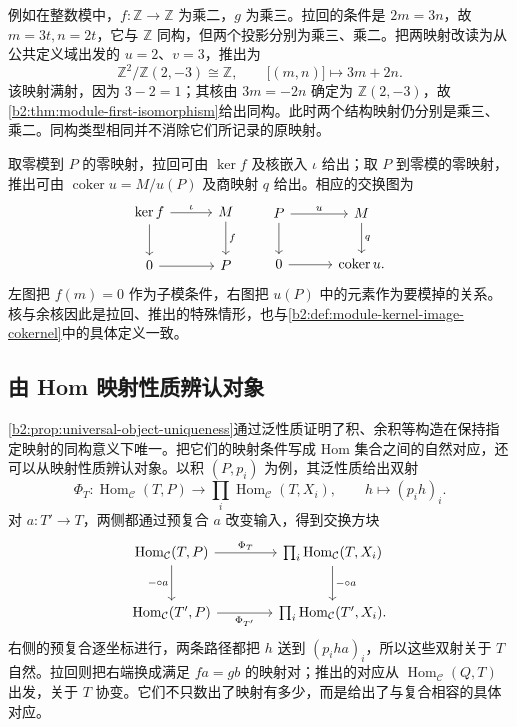\ProseParagraphBreak
例如在整数模中，\(f:\mathbb Z\rightarrow\mathbb Z\) 为乘二，\(g\) 为乘三。拉回的条件是 \(2m=3n\)，故 \(m=3t,n=2t\)，它与 \(\mathbb Z\) 同构，但两个投影分别为乘三、乘二。把两映射改读为从公共定义域出发的 \(u=2\)、\(v=3\)，推出为
\[
	\mathbb Z^2/\mathbb Z(2,-3)\cong\mathbb Z, \qquad \bigl[(m,n)\bigr]\longmapsto3m+2n.
\]
该映射满射，因为 \(3-2=1\)；其核由 \(3m=-2n\) 确定为 \(\mathbb Z(2,-3)\)，故\cref{b2:thm:module-first-isomorphism}给出同构。此时两个结构映射仍分别是乘三、乘二。同构类型相同并不消除它们所记录的原映射。

\ProseParagraphBreak
取零模到 \(P\) 的零映射，拉回可由 \(\ker f\) 及核嵌入 \(\iota\) 给出；取 \(P\) 到零模的零映射，推出可由 \(\operatorname{coker}u=M/u(P)\) 及商映射 \(q\) 给出。相应的交换图为
\[
	\begin{tikzcd}[column sep=3em,row sep=2.2em]
		\ker f\arrow[r,"\iota"]\arrow[d]&M\arrow[d,"f"]\\
		0\arrow[r]&P
	\end{tikzcd}
	\qquad
	\begin{tikzcd}[column sep=3em,row sep=2.2em]
		P\arrow[r,"u"]\arrow[d]&M\arrow[d,"q"]\\
		0\arrow[r]&\operatorname{coker}u.
	\end{tikzcd}
\]
左图把 \(f(m)=0\) 作为子模条件，右图把 \(u(P)\) 中的元素作为要模掉的关系。核与余核因此是拉回、推出的特殊情形，也与\cref{b2:def:module-kernel-image-cokernel}中的具体定义一致。

\subsection{由 Hom 映射性质辨认对象}
\label{b2:subsec:0503:03}

\cref{b2:prop:universal-object-uniqueness}通过泛性质证明了积、余积等构造在保持指定映射的同构意义下唯一。把它们的映射条件写成 Hom 集合之间的自然对应，还可以从映射性质辨认对象。以积 \((P,p_i)\) 为例，其泛性质给出双射
\[
	\Phi_T:\operatorname{Hom}_{\mathcal C}(T,P)\longrightarrow \prod_i\operatorname{Hom}_{\mathcal C}(T,X_i),\qquad h\longmapsto(p_ih)_i.
\]
对 \(a:T'\rightarrow T\)，两侧都通过预复合 \(a\) 改变输入，得到交换方块
\[
	\begin{tikzcd}[column sep=4em,row sep=2.5em]
		\operatorname{Hom}_{\mathcal C}(T,P) \arrow[r,"\Phi_T"]\arrow[d,"-\circ a"']& \prod_i\operatorname{Hom}_{\mathcal C}(T,X_i)\arrow[d,"-\circ a"]\\
		\operatorname{Hom}_{\mathcal C}(T',P)\arrow[r,"\Phi_{T'}"']& \prod_i\operatorname{Hom}_{\mathcal C}(T',X_i).
	\end{tikzcd}
\]
右侧的预复合逐坐标进行，两条路径都把 \(h\) 送到 \((p_iha)_i\)，所以这些双射关于 \(T\) 自然。拉回则把右端换成满足 \(fa=gb\) 的映射对；推出的对应从 \(\operatorname{Hom}_{\mathcal C}(Q,T)\) 出发，关于 \(T\) 协变。它们不只数出了映射有多少，而是给出了与复合相容的具体对应。

